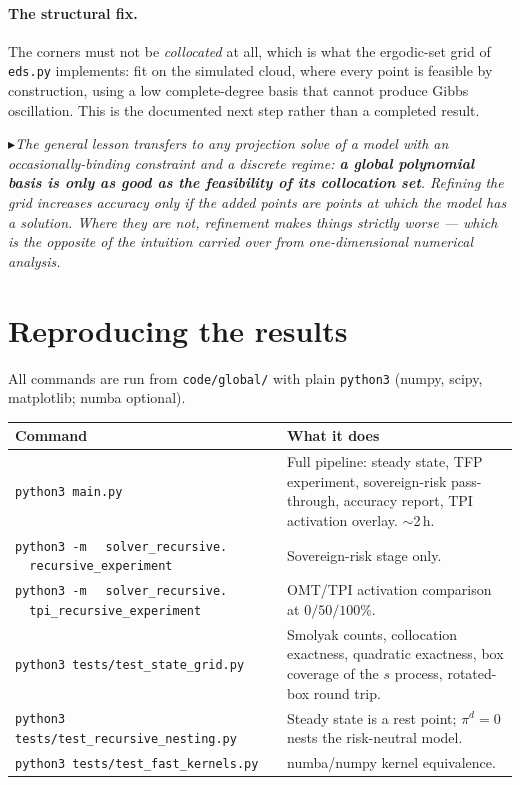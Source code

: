 \documentclass[11pt]{article}
\numberwithin{equation}{section}
\newcommand{\code}[1]{\texttt{\small #1}}
\theoremstyle{definition}
\theoremstyle{plain}
\theoremstyle{remark}
\newcommand{\trick}[1]{\par\smallskip\noindent
  \textcolor{notec}{$\blacktriangleright$}\;\emph{#1}\par\smallskip}
\begin{document}
\paragraph{The structural fix.} The corners must not be \emph{collocated} at all,
which is what the ergodic-set grid of \code{eds.py} implements: fit on the simulated
cloud, where every point is feasible by construction, using a low complete-degree
basis that cannot produce Gibbs oscillation. This is the documented next step rather
than a completed result.

\trick{The general lesson transfers to any projection solve of a model with an
occasionally-binding constraint and a discrete regime: \textbf{a global polynomial
basis is only as good as the feasibility of its collocation set}. Refining the grid
increases accuracy only if the added points are points at which the model has a
solution. Where they are not, refinement makes things strictly worse --- which is the
opposite of the intuition carried over from one-dimensional numerical analysis.}

\clearpage
\appendix
\section{Reproducing the results}

All commands are run from \code{code/global/} with plain \code{python3} (numpy,
scipy, matplotlib; numba optional).

\begin{center}\footnotesize
\begin{tabular}{@{}>{\raggedright\arraybackslash}p{6.9cm}>{\raggedright\arraybackslash}p{7.8cm}@{}}
\toprule
Command & What it does \\
\midrule
\code{python3 main.py} &
Full pipeline: steady state, TFP experiment, sovereign-risk pass-through, accuracy
report, TPI activation overlay. $\sim$2\,h. \\
\code{python3 -m}\newline
\code{\ \ solver\_recursive.}\newline
\code{\ \ recursive\_experiment} &
Sovereign-risk stage only. \\
\code{python3 -m}\newline
\code{\ \ solver\_recursive.}\newline
\code{\ \ tpi\_recursive\_experiment} &
OMT/TPI activation comparison at $0/50/100\%$. \\
\code{python3 tests/test\_state\_grid.py} &
Smolyak counts, collocation exactness, quadratic exactness, box coverage of the $s$
process, rotated-box round trip. \\
\code{python3 tests/test\_recursive\_nesting.py} &
Steady state is a rest point; $\pi^{d}=0$ nests the risk-neutral model. \\
\code{python3 tests/test\_fast\_kernels.py} &
numba/numpy kernel equivalence. \\
\bottomrule
\end{tabular}
\end{center}
\end{document}
